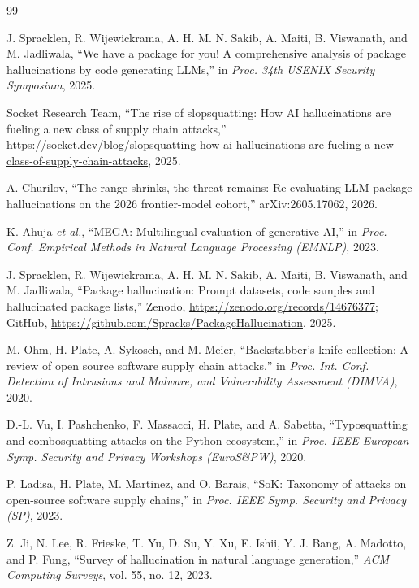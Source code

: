 \documentclass[conference]{IEEEtran}
\begin{document}
\begin{thebibliography}{99}

 J. Spracklen, R. Wijewickrama, A. H. M. N. Sakib, A. Maiti, B. Viswanath, and M. Jadliwala, ``We have a package for you! A comprehensive analysis of package hallucinations by code generating LLMs,'' in \emph{Proc. 34th USENIX Security Symposium}, 2025.

 Socket Research Team, ``The rise of slopsquatting: How AI hallucinations are fueling a new class of supply chain attacks,'' \url{https://socket.dev/blog/slopsquatting-how-ai-hallucinations-are-fueling-a-new-class-of-supply-chain-attacks}, 2025.

 A. Churilov, ``The range shrinks, the threat remains: Re-evaluating LLM package hallucinations on the 2026 frontier-model cohort,'' arXiv:2605.17062, 2026.

 K. Ahuja \emph{et al.}, ``MEGA: Multilingual evaluation of generative AI,'' in \emph{Proc. Conf. Empirical Methods in Natural Language Processing (EMNLP)}, 2023.

 J. Spracklen, R. Wijewickrama, A. H. M. N. Sakib, A. Maiti, B. Viswanath, and M. Jadliwala, ``Package hallucination: Prompt datasets, code samples and hallucinated package lists,'' Zenodo, \url{https://zenodo.org/records/14676377}; GitHub, \url{https://github.com/Spracks/PackageHallucination}, 2025.

 M. Ohm, H. Plate, A. Sykosch, and M. Meier, ``Backstabber's knife collection: A review of open source software supply chain attacks,'' in \emph{Proc. Int. Conf. Detection of Intrusions and Malware, and Vulnerability Assessment (DIMVA)}, 2020.

 D.-L. Vu, I. Pashchenko, F. Massacci, H. Plate, and A. Sabetta, ``Typosquatting and combosquatting attacks on the Python ecosystem,'' in \emph{Proc. IEEE European Symp. Security and Privacy Workshops (EuroS\&PW)}, 2020.

 P. Ladisa, H. Plate, M. Martinez, and O. Barais, ``SoK: Taxonomy of attacks on open-source software supply chains,'' in \emph{Proc. IEEE Symp. Security and Privacy (SP)}, 2023.

 Z. Ji, N. Lee, R. Frieske, T. Yu, D. Su, Y. Xu, E. Ishii, Y. J. Bang, A. Madotto, and P. Fung, ``Survey of hallucination in natural language generation,'' \emph{ACM Computing Surveys}, vol. 55, no. 12, 2023.


\end{thebibliography}
\end{document}
